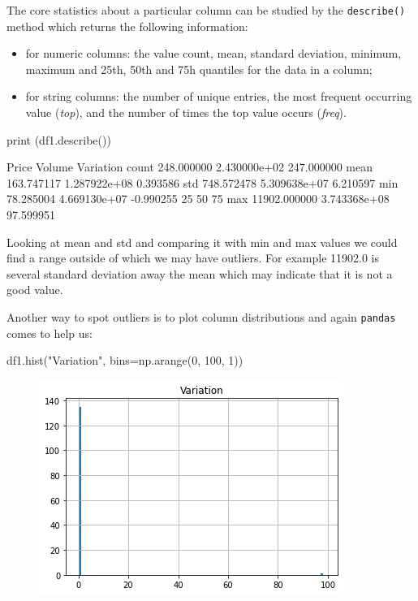 The core statistics about a particular column can be studied by the \texttt{describe()} method which returns the following information:
\begin{itemize}
\tightlist
\item for numeric columns: the value count, mean, standard deviation, minimum, maximum and 25th, 50th and 75h quantiles for the data in a column;
\item for string columns: the number of unique entries, the most frequent occurring value (\emph{top}), and the number of times the top value occurs (\emph{freq}).
\end{itemize}

\begin{ipython}
print (df1.describe())
\end{ipython}
\begin{ioutput}
              Price        Volume   Variation
count    248.000000  2.430000e+02  247.000000
mean     163.747117  1.287922e+08    0.393586
std      748.572478  5.309638e+07    6.210597
min       78.285004  4.669130e+07   -0.990255
25%
50%
75%
max    11902.000000  3.743368e+08   97.599951
\end{ioutput}
        
Looking at mean and std and comparing it with min and max values we could find a range outside of which we may have outliers. For example 11902.0 is several standard deviation away the mean which may indicate that it is not a good value.

Another way to spot outliers is to plot column distributions and again \texttt{pandas} comes to help us:
\begin{ipython}
df1.hist("Variation", bins=np.arange(0, 100, 1))
\end{ipython}

\begin{figure}
	\centering
	\includegraphics[width=0.7\linewidth]{figures/volume_plot}
\end{figure}

